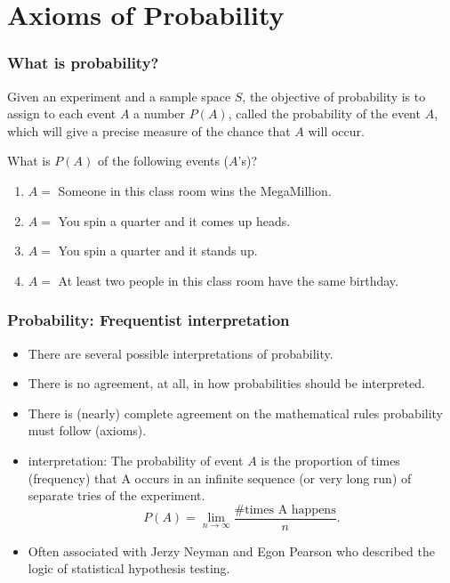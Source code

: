 \documentclass[slidestop,compress,mathserif]{beamer}
\begin{document}
\section{Axioms of Probability}


\begin{frame}\frametitle{What is probability?}

Given an experiment and a sample space $S$,
the objective of probability is to assign to each event $A$ a number $P(A)$, called the probability of the event $A$,
which will give a precise measure of the chance that $A$ will occur.


\pause
\vspace{0.5cm}
What is $P(A)$ of the following events ($A$'s)?
\begin{enumerate}

\item $A =$ Someone in this class room wins the MegaMillion.
\item $A =$ You spin a quarter and it comes up heads.
\item $A =$ You spin a quarter and it stands up.
\item $A =$ At least two people in this class room have the same birthday.

\end{enumerate}
\end{frame}


\begin{frame}\frametitle{Probability: Frequentist interpretation}
\begin{itemize}

\item There are several possible interpretations of probability.
\item There is no agreement, at all, in how probabilities should be interpreted.
\item There is (nearly) complete agreement on the mathematical rules probability must follow (axioms).

\pause
\item {} interpretation: The probability of event $A$ is the proportion of times (frequency) that A occurs in an infinite sequence (or very long run) of separate tries of the experiment.
\[ P(A)= \lim_{n \rightarrow \infty} \frac{\mbox{\# times A happens}}{n}.\]

\pause
 \item Often associated with Jerzy Neyman and Egon Pearson who described the logic of statistical hypothesis testing.


\end{itemize}
\end{frame}
\end{document}
